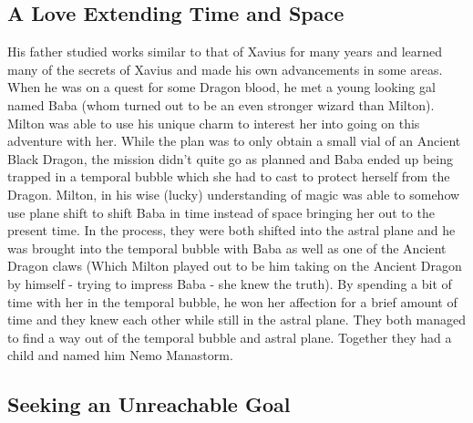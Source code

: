 \documentclass[letterpaper,10pt,twoside,twocolumn,openany]{book}
\begin{document}
\subsection{A Love Extending Time and Space}

His father studied works similar to that of Xavius for many years and learned many of the secrets of Xavius and made his own advancements in some areas. When he was on a quest for some Dragon blood, he met a young looking gal named Baba (whom turned out to be an even stronger wizard than Milton). Milton was able to use his unique charm to interest her into going on this adventure with her. While the plan was to only obtain a small vial of an Ancient Black Dragon, the mission didn't quite go as planned and Baba ended up being trapped in a temporal bubble which she had to cast to protect herself from the Dragon. Milton, in his wise (lucky) understanding of magic was able to somehow use plane shift to shift Baba in time instead of space bringing her out to the present time. In the process, they were both shifted into the astral plane and he was brought into the temporal bubble with Baba as well as one of the Ancient Dragon claws (Which Milton played out to be him taking on the Ancient Dragon by himself - trying to impress Baba - she knew the truth). By spending a bit of time with her in the temporal bubble, he won her affection for a brief amount of time and they knew each other while still in the astral plane. They both managed to find a way out of the temporal bubble and astral plane. Together they had a child and named him Nemo Manastorm.

\subsection{Seeking an Unreachable Goal}
\end{document}
